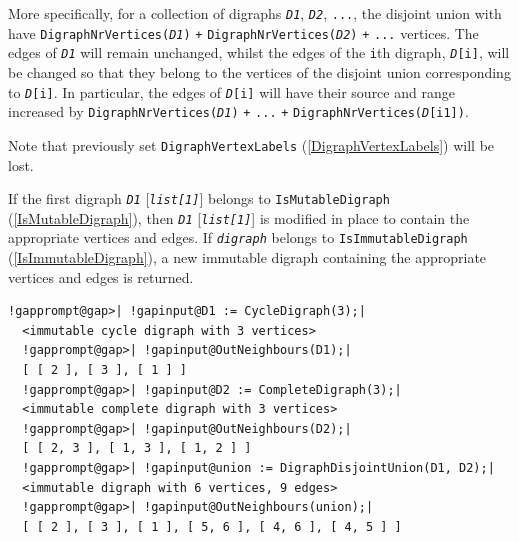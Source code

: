 \documentclass[a4paper,11pt]{report}
\begin{document}
{{{ More specifically, for a collection of digraphs \mbox{\texttt{\mdseries\slshape D1}}, \mbox{\texttt{\mdseries\slshape D2}}, \texttt{...}, the disjoint union with have \texttt{DigraphNrVertices(}\mbox{\texttt{\mdseries\slshape D1}}\texttt{)} \texttt{+} \texttt{DigraphNrVertices(}\mbox{\texttt{\mdseries\slshape D2}}\texttt{)} \texttt{+} \texttt{...} vertices. The edges of \mbox{\texttt{\mdseries\slshape D1}} will remain unchanged, whilst the edges of the \texttt{i}th digraph, \mbox{\texttt{\mdseries\slshape D}}\texttt{[i]}, will be changed so that they belong to the vertices of the disjoint union
corresponding to \mbox{\texttt{\mdseries\slshape D}}\texttt{[i]}. In particular, the edges of \mbox{\texttt{\mdseries\slshape D}}\texttt{[i]} will have their source and range increased by \texttt{DigraphNrVertices(}\mbox{\texttt{\mdseries\slshape D1}}\texttt{)} \texttt{+} \texttt{...} \texttt{+} \texttt{DigraphNrVertices(}\mbox{\texttt{\mdseries\slshape D}}\texttt{[i\texttt{}1])}. 

 Note that previously set \texttt{DigraphVertexLabels} (\ref{DigraphVertexLabels}) will be lost.

 If the first digraph \mbox{\texttt{\mdseries\slshape D1}} [\mbox{\texttt{\mdseries\slshape list[1]}}] belongs to \texttt{IsMutableDigraph} (\ref{IsMutableDigraph}), then \mbox{\texttt{\mdseries\slshape D1}} [\mbox{\texttt{\mdseries\slshape list[1]}}] is modified in place to contain the appropriate vertices and edges. If \mbox{\texttt{\mdseries\slshape digraph}} belongs to \texttt{IsImmutableDigraph} (\ref{IsImmutableDigraph}), a new immutable digraph containing the appropriate vertices and edges is
returned. 
\begin{Verbatim}[commandchars=!@|,fontsize=\small,frame=single,label=Example]
  !gapprompt@gap>| !gapinput@D1 := CycleDigraph(3);|
  <immutable cycle digraph with 3 vertices>
  !gapprompt@gap>| !gapinput@OutNeighbours(D1);|
  [ [ 2 ], [ 3 ], [ 1 ] ]
  !gapprompt@gap>| !gapinput@D2 := CompleteDigraph(3);|
  <immutable complete digraph with 3 vertices>
  !gapprompt@gap>| !gapinput@OutNeighbours(D2);|
  [ [ 2, 3 ], [ 1, 3 ], [ 1, 2 ] ]
  !gapprompt@gap>| !gapinput@union := DigraphDisjointUnion(D1, D2);|
  <immutable digraph with 6 vertices, 9 edges>
  !gapprompt@gap>| !gapinput@OutNeighbours(union);|
  [ [ 2 ], [ 3 ], [ 1 ], [ 5, 6 ], [ 4, 6 ], [ 4, 5 ] ]
\end{Verbatim}
 }

 

}}
\end{document}
